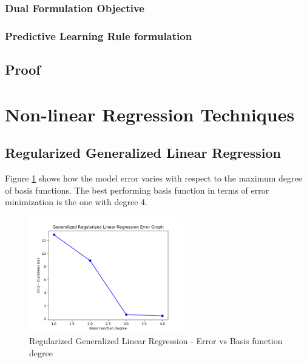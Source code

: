 \documentclass[parskip=full]{scrartcl}
\begin{document}
        \subsubsection{Dual Formulation Objective} %
        \label{ssub:dual_formulation_objective}


        

        \subsubsection{Predictive Learning Rule formulation} %
        \label{ssub:predictive_learning_rule_formulation}
        



    \subsection*{Proof} %
    \label{sub:proof_2}
    



\section{Non-linear Regression Techniques} %
\label{sec:non_linear_regression_techniques}

    \subsection{Regularized Generalized Linear Regression} %
    \label{sub:regularized_generalized_linear_regression}
    
        Figure \ref{fig:rglg_err_v_deg} shows how the model error varies with respect to the maximum degree of basis functions. The best performing basis function in terms of error minimization is the one with degree 4.

        \begin{figure}[ht]
            \centering
            \includegraphics[width=0.6\textwidth]{3a_degree_vs_error.png}
            \caption{Regularized Generalized Linear Regression - Error vs Basis function degree}
            \label{fig:rglg_err_v_deg}
        \end{figure}
\end{document}
